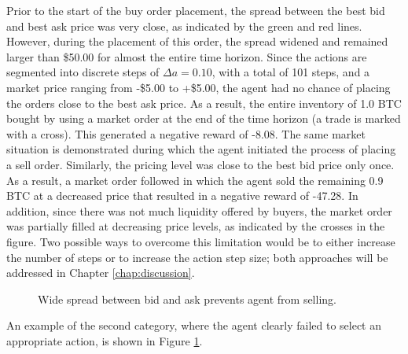 Prior to the start of the buy order placement, the spread between the best bid and best ask price was very close, as indicated by the green and red lines.
However, during the placement of this order, the spread widened and remained larger than \$50.00 for almost the entire time horizon.
Since the actions are segmented into discrete steps of $\Delta{a}=0.10$, with a total of 101 steps, and a market price ranging from -\$5.00 to +\$5.00, the agent had no chance of placing the orders close to the best ask price.
As a result, the entire inventory of 1.0 BTC bought by using a market order at the end of the time horizon (a trade is marked with a cross).
This generated a negative reward of -8.08.
The same market situation is demonstrated during which the agent initiated the process of placing a sell order.
Similarly, the pricing level was close to the best bid price only once.
As a result, a market order followed in which the agent sold the remaining 0.9 BTC at a decreased price that resulted in a negative reward of -47.28.
In addition, since there was not much liquidity offered by buyers, the market order was partially filled at decreasing price levels, as indicated by the crosses in the figure.
Two possible ways to overcome this limitation would be to either increase the number of steps or to increase the action step size; both approaches will be addressed in Chapter \ref{chap:discussion}.
\begin{figure}[H]
    \centering
    \caption{Wide spread between bid and ask prevents agent from selling.}
    \label{fig:analysis-limit-impatient}
\end{figure}
An example of the second category, where the agent clearly failed to select an appropriate action, is shown in Figure \ref{fig:analysis-limit-impatient}.
